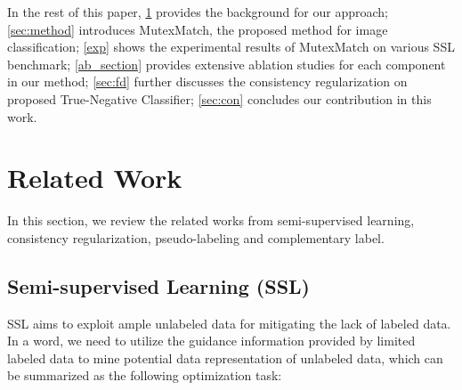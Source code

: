 \documentclass[lettersize,journal]{IEEEtran}
\theoremstyle{plain}
\theoremstyle{definition}
\theoremstyle{remark}
\begin{document}
In the rest of this paper, \cref{rework} provides the background for our approach;  \cref{sec:method} introduces MutexMatch, the proposed method for image classification; \cref{exp} shows the experimental results of MutexMatch on various SSL benchmark; \cref{ab_section} provides extensive ablation studies for each component in our method; \cref{sec:fd} further discusses the consistency regularization on proposed True-Negative Classifier; \cref{sec:con} concludes our contribution in this work. 

\section{Related Work}
\label{rework}
In this section, we review the related works from semi-supervised learning, consistency regularization, pseudo-labeling and complementary label.

\subsection{Semi-supervised Learning (SSL)} 
SSL aims to exploit ample unlabeled data for mitigating the lack of labeled data. In a word, we need to utilize the guidance information provided by limited labeled data to mine potential data representation of unlabeled data, 
which can be summarized as the following optimization task:
\end{document}
